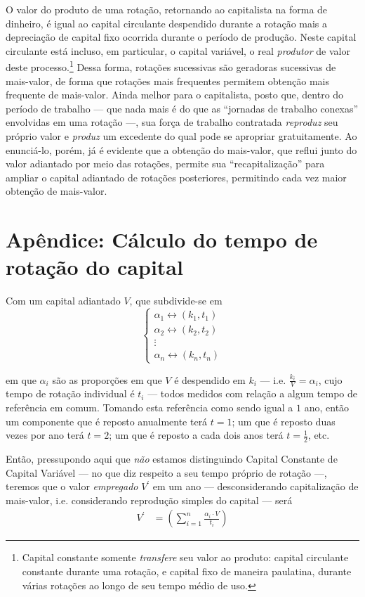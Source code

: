 O valor do produto de uma rotação, retornando ao capitalista na forma de dinheiro, é igual ao capital circulante despendido durante a rotação mais a depreciação de capital fixo ocorrida durante o período de produção. Neste capital circulante está incluso, em particular, o capital variável, o real \textit{produtor} de valor deste processo.\footnote{Capital constante somente \textit{transfere} seu valor ao produto: capital circulante constante durante uma rotação, e capital fixo de maneira paulatina, durante várias rotações ao longo de seu tempo médio de uso.} Dessa forma, rotações sucessivas são geradoras sucessivas de mais-valor, de forma que rotações mais frequentes permitem obtenção mais frequente de mais-valor. Ainda melhor para o capitalista, posto que, dentro do período de trabalho — que nada mais é do que as ``jornadas de trabalho conexas'' envolvidas em uma rotação \parencite[p. 321]{Marx2014} —, sua força de trabalho contratada \textit{reproduz} seu próprio valor e \textit{produz} um excedente do qual pode se apropriar gratuitamente. Ao enunciá-lo, porém, já é evidente que a obtenção do mais-valor, que reflui junto do valor adiantado por meio das rotações, permite sua ``recapitalização'' para ampliar o capital adiantado de rotações posteriores, permitindo cada vez maior obtenção de mais-valor.

\section{Apêndice: Cálculo do tempo de rotação do capital}
Com um capital adiantado $V$, que subdivide-se em
$$
\begin{cases}
\alpha_{1} \leftrightarrow  (k_{1}, t_{1}) \\
\alpha_{2} \leftrightarrow  (k_{2}, t_{2}) \\
\vdots \\
\alpha_{n} \leftrightarrow  (k_{n}, t_{n})
\end{cases}
$$

em que $\alpha_{i}$ são as proporções em que $V$ é despendido em $k_{i}$ — i.e. $\frac{k_{i}}{V} = \alpha_{i}$, cujo tempo de rotação individual é $t_{i}$ — todos medidos com relação a algum tempo de referência em comum. Tomando esta referência como sendo igual a $1$ ano, então um componente que é reposto anualmente terá $t=1$; um que é reposto duas vezes por ano terá $t=2$; um que é reposto a cada dois anos terá $t=\frac{1}{2}$, etc.

Então, pressupondo aqui que \textit{não} estamos distinguindo Capital Constante de Capital Variável — no que diz respeito a seu tempo próprio de rotação —, teremos que o valor \textit{empregado} $V^\prime$ em um ano — desconsiderando capitalização de mais-valor, i.e. considerando reprodução simples do capital — será
\begin{align*}
V^\prime &= \left( \sum \limits_{i=1}^{n} \frac{\alpha_{i} \cdot V}{t_{i}} \right)
\end{align*}

